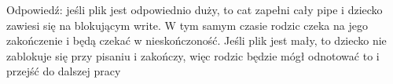 Odpowiedź: jeśli plik jest odpowiednio duży, to cat zapełni cały pipe i dziecko zawiesi się na blokującym write. W tym samym czasie rodzic czeka na jego zakończenie i będą czekać w nieskończoność. Jeśli plik jest mały, to dziecko nie zablokuje się przy pisaniu i zakończy, więc rodzic będzie mógł odnotować to i przejść do dalszej pracy

